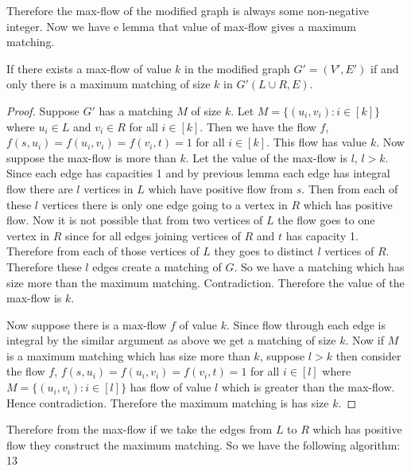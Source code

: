 Therefore the max-flow of the modified graph is always some non-negative integer. Now we have e lemma that value of max-flow gives a maximum matching.
\begin{lemma}{}{}
	If there exists a max-flow of value $k$ in the modified graph $G'=(V',E')$ if and only there is a maximum matching of size $k$ in $G'(L\cup R, E)$. 
\end{lemma}
\begin{proof}
	Suppose $G'$ has a matching $M$ of size $k$. Let $M=\{(u_i,v_i)\colon i\in[k]\}$ where $u_i\in L$ and $v_i\in R$ for all $i\in[k]$. Then we have the flow $f$, $f(s,u_i)=f(u_i,v_i)=f(v_i,t)=1$ for all $i\in[k]$. This flow has value $k$. Now suppose the max-flow is more than $k$. Let the value of the max-flow is $l$, $l>k$. Since each edge has capacities 1 and by previous lemma each edge has integral flow there are $l$ vertices in $L$ which have positive flow from $s$. Then from each of these $l$ vertices there is only one edge going to a vertex in $R$ which has positive flow. Now it is not possible that from two vertices of $L$ the flow goes to one vertex in $R$ since for all edges joining vertices of $R$ and $t$ has capacity 1. Therefore from each of those vertices of $L$ they goes to distinct $l$ vertices of $R$. Therefore these $l$ edges  create a matching of $G$. So we have a matching which has size more than the maximum matching. Contradiction. Therefore the value of the max-flow is $k$.
	
	Now suppose there is a max-flow $f$ of value $k$. Since flow through each edge is integral by the similar argument as above we get a matching of size $k$. Now if $M$ is a maximum matching which has size more than $k$, suppose $l>k$ then consider the flow  $f$, $f(s,u_i)=f(u_i,v_i)=f(v_i,t)=1$ for all $i\in[l]$ where  $M=\{(u_i,v_i)\colon i\in[l]\}$ has flow of value $l$ which is greater than the max-flow. Hence contradiction. Therefore the maximum matching is has size $k$.
\end{proof}


Therefore from the max-flow if we take the edges from $L$ to $R$ which has positive flow they construct the maximum matching. So we have the following algorithm: 13
\begin{algorithm}\DontPrintSemicolon
	\caption{}
\end{algorithm} 

